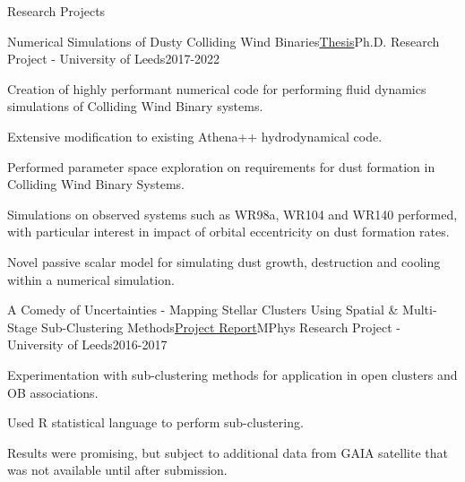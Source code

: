 \documentclass{resume} %
\begin{document}
\begin{rSection}{Research Projects}

\begin{rSubsection}{Numerical Simulations of Dusty Colliding Wind Binaries}{\href{https://raw.githubusercontent.com/atomsite/Thesis/master/Thesis.pdf}{Thesis}}{Ph.D. Research Project - University of Leeds}{2017-2022}
\item Creation of highly performant numerical code for performing fluid dynamics simulations of Colliding Wind Binary systems.
\item Extensive modification to existing Athena++ hydrodynamical code.
\item Performed parameter space exploration on requirements for dust formation in Colliding Wind Binary Systems.
\item Simulations on observed systems such as WR98a, WR104 and WR140 performed, with particular interest in impact of orbital eccentricity on dust formation rates. 
\item Novel passive scalar model for simulating dust growth, destruction and cooling within a numerical simulation.
\end{rSubsection}

\begin{rSubsection}{A Comedy of Uncertainties - Mapping Stellar Clusters Using Spatial \& Multi-Stage Sub-Clustering Methods}{\href{https://raw.githubusercontent.com/atomsite/masters-project/main/masters-report.pdf}{Project Report}}{MPhys Research Project - University of Leeds}{2016-2017}
\item Experimentation with sub-clustering methods for application in open clusters and OB associations.
\item Used R statistical language to perform sub-clustering.
\item Results were promising, but subject to additional data from GAIA satellite that was not available until after submission.
\end{rSubsection}


\end{rSection}


\end{document}
